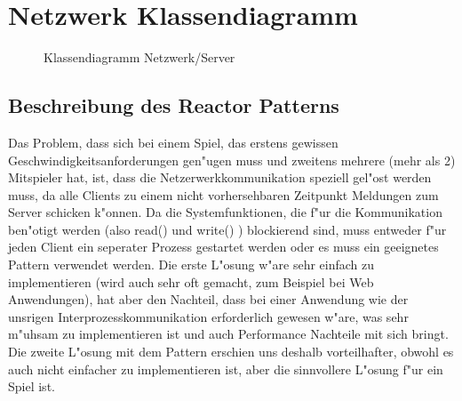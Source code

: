 \section{Netzwerk Klassendiagramm}

\begin{figure}[H]
  \begin{center}
  \end{center}
  \caption{Klassendiagramm Netzwerk/Server}
\end{figure}

\subsection{Beschreibung des Reactor Patterns}
Das Problem, dass sich bei einem Spiel, das erstens gewissen Geschwindigkeitsanforderungen gen"ugen muss und zweitens mehrere 
(mehr als 2) Mitspieler hat, ist, dass die Netzerwerkkommunikation speziell gel"ost werden muss, da alle Clients zu einem
nicht vorhersehbaren Zeitpunkt Meldungen zum Server schicken k"onnen. Da die Systemfunktionen, die f"ur die Kommunikation ben"otigt
werden (also read() und write() ) blockierend sind, muss entweder f"ur jeden Client ein seperater Prozess gestartet werden oder es 
muss ein geeignetes Pattern verwendet werden. Die erste L"osung w"are sehr einfach zu implementieren (wird auch sehr oft gemacht, zum
Beispiel bei Web Anwendungen), hat aber den Nachteil, dass bei einer Anwendung wie der unsrigen Interprozesskommunikation erforderlich
gewesen w"are, was sehr m"uhsam zu implementieren ist und auch Performance Nachteile mit sich bringt.
Die zweite L"osung mit dem Pattern erschien uns deshalb vorteilhafter, obwohl es auch nicht einfacher zu implementieren ist, 
aber die sinnvollere L"osung f"ur ein Spiel ist. 

